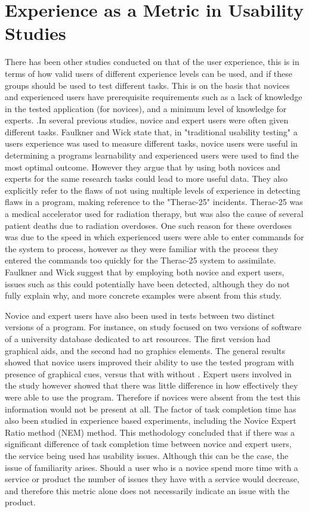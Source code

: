 \section{Experience as a Metric in Usability Studies}
There has been other studies conducted on that of the user experience, this is in terms of how valid users of different experience levels can be used, and if these groups should be used to test different tasks. This is on the basis that novices and experienced users have prerequisite requirements such as a lack of knowledge in the tested application (for novices), and a minimum level of knowledge for experts. \citep{popovic2000expert}.In several previous studies, novice and expert users were often given different tasks. Faulkner and Wick state that, in "traditional usability testing" a users experience was used to measure different tasks, novice users were useful in determining a programs learnability and experienced users were used to find the most optimal outcome.\citep{faulkner2005cross} However they argue that by using both novices and experts for the same research tasks could lead to more useful data. They also explicitly refer to the flaws of not using multiple levels of experience in detecting flaws in a program, making reference to the "Therac-25" incidents. Therac-25 was a medical accelerator used for radiation therapy, but was also the cause of several patient deaths due to radiation overdoses. One such reason for these overdoses was due to the speed in which experienced users were able to enter commands for the system to process, however as they were familiar with the process they entered the commands too quickly for the Therac-25 system to assimilate. Faulkner and Wick suggest that by employing both novice and expert users, issues such as this could potentially have been detected, although they do not fully explain why, and more concrete examples were absent from this study.

 Novice and expert users have also been used in tests between two distinct versions of a program. For instance, on study focused on two versions of software of a university database dedicated to art resources. The first version had graphical aids, and the second had no graphics elements. The general results showed that novice users improved their ability to use the tested program with presence of graphical cues, versus that with without \citep{dillon1997empirical}. Expert users involved in the study however showed that there was little difference in how effectively they were able to use the program. Therefore if novices were absent from the test this information would not be present at all. The factor of task completion time has also been studied in experience based experiments, including the Novice Expert Ratio method (NEM) method. This methodology concluded that if there was a significant difference of task completion time between novice and expert users, the service being used has usability issues.\citep{urokohara2000nem} Although this can be the case, the issue of familiarity arises. Should a user who is a novice spend more time with a service or product the number of issues they have with a service would decrease, and therefore this metric alone does not necessarily indicate an issue with the product.

